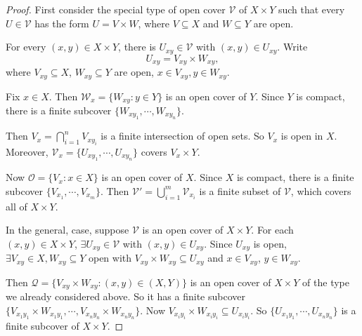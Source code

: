 \documentclass[a4paper]{article}
\begin{document}
\begin{proof}
  First consider the special type of open cover $\mathcal{V}$ of $X\times Y$ such that every $U\in \mathcal{V}$ has the form $U = V\times W$, where $V\subseteq X$ and $W\subseteq Y$ are open.

  For every $(x, y) \in X\times Y$, there is $U_{xy}\in \mathcal{V}$ with $(x, y)\in U_{xy}$. Write
  \[
    U_{xy} = V_{xy}\times W_{xy},
  \]
  where $V_{xy}\subseteq X$, $W_{xy}\subseteq Y$ are open, $x\in V_{xy}, y\in W_{xy}$.

  Fix $x\in X$. Then $\mathcal{W}_x = \{W_{xy}: y\in Y\}$ is an open cover of $Y$. Since $Y$ is compact, there is a finite subcover $\{W_{xy_1}, \cdots, W_{xy_n}\}$.

  Then $V_x = \bigcap_{i = 1}^n V_{xy_i}$ is a finite intersection of open sets. So $V_x$ is open in $X$. Moreover, $\mathcal{V}_x = \{U_{xy_1},\cdots , U_{xy_n}\}$ covers $V_x \times Y$.
  \begin{center}
  \end{center}
  Now $\mathcal{O} = \{V_x: x\in X\}$ is an open cover of $X$. Since $X$ is compact, there is a finite subcover $\{V_{x_1}, \cdots, V_{x_m}\}$. Then $\mathcal{V}' = \bigcup_{i = 1}^m \mathcal{V}_{x_i}$ is a finite subset of $\mathcal{V}$, which covers all of $X\times Y$.

  In the general, case, suppose $\mathcal{V}$ is an open cover of $X\times Y$. For each $(x, y) \in X\times Y$, $\exists U_{xy}\in \mathcal{V}$ with $(x, y)\in U_{xy}$. Since $U_{xy}$ is open, $\exists V_{xy}\in X, W_{xy}\subseteq Y$ open with $V_{xy}\times W_{xy}\subseteq U_{xy}$ and $x\in V_{xy}$, $y\in W_{xy}$.

  Then $\mathcal{Q} = \{V_{xy}\times W_{xy}: (x, y)\in (X, Y)\}$ is an open cover of $X\times Y$ of the type we already considered above. So it has a finite subcover $\{V_{x_1y_1}\times W_{x_1y_1}, \cdots, V_{x_n y_n}\times W_{x_n y_n}\}$. Now $V_{x_iy_i} \times W_{x_iy_i} \subseteq U_{x_iy_i}$. So $\{U_{x_1y_1},\cdots, U_{x_n y_n}\}$ is a finite subcover of $X\times Y$.
\end{proof}
\end{document}
